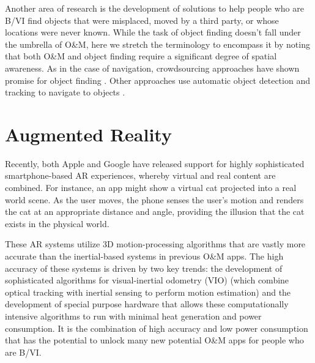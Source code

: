 \documentclass[chi_draft]{sigchi}
\newcommand{\BVI}{B/VI\xspace}
\newcommand{\OM}{O\&M\xspace}
\begin{document}
Another area of research is the development of solutions to help people who are \BVI find objects that were misplaced, moved by a third party, or whose locations were never known.  While the task of object finding doesn't fall under the umbrella of \OM, here we stretch the terminology to encompass it by noting that both \OM and object finding require a significant degree of spatial awareness.  As in the case of navigation, crowdsourcing approaches have shown promise for object finding \cite{bigham2010vizwizlocateit}.  Other approaches use automatic object detection and tracking to navigate to objects \cite{schauerte2012assistive, jafri2014computer, thakoor2014system}.

\section{Augmented Reality}
%

Recently, both Apple and Google have released support for highly sophisticated smartphone-based AR experiences, whereby virtual and real content are combined.  For instance, an app might show a virtual cat projected into a real world scene.  As the user moves, the phone senses the user's motion and renders the cat at an appropriate distance and angle, providing the illusion that the cat exists in the physical world.

These AR systems utilize 3D motion-processing algorithms that are vastly more accurate than the inertial-based systems in previous \OM apps.  The high accuracy of these systems is driven by two key trends: the development of sophisticated algorithms for visual-inertial odometry (VIO) \cite{li2013high,leutenegger2015keyframe,bloesch2015robust,forster2014svo} (which combine optical tracking with inertial sensing to perform motion estimation) and the development of special purpose hardware that allows these computationally intensive algorithms to run with minimal heat generation and power consumption.  It is the combination of high accuracy and low power consumption that has the potential to unlock many new potential \OM apps for people who are \BVI.
\end{document}
